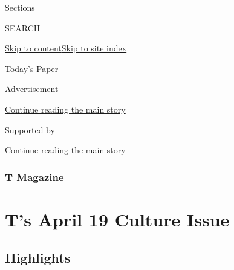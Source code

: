 Sections

SEARCH

\protect\hyperlink{site-content}{Skip to
content}\protect\hyperlink{site-index}{Skip to site index}

\href{https://myaccount.nytimes3xbfgragh.onion/auth/login?response_type=cookie\&client_id=vi}{}

\href{https://www.nytimes3xbfgragh.onion/section/todayspaper}{Today's
Paper}

Advertisement

\protect\hyperlink{after-top}{Continue reading the main story}

Supported by

\protect\hyperlink{after-sponsor}{Continue reading the main story}

\hypertarget{t-magazine}{%
\subsubsection{\texorpdfstring{\href{/section/t-magazine}{T
Magazine}}{T Magazine}}\label{t-magazine}}

\hypertarget{ts-april-19-culture-issue}{%
\section{T's April 19 Culture Issue}\label{ts-april-19-culture-issue}}

\hypertarget{highlights}{%
\subsection{Highlights}\label{highlights}}

